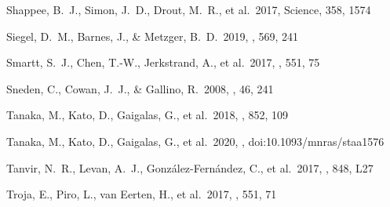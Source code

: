 \documentclass[twocolumn]{aastex63}
\begin{document}
\begin{thebibliography}{}



 Shappee, B.~J., Simon, J.~D., Drout, M.~R., et al.\ 2017, Science, 358, 1574




 Siegel, D.~M., Barnes, J., \& Metzger, B.~D.\ 2019, \nat, 569, 241

 Smartt, S.~J., Chen, T.-W., Jerkstrand, A., et al.\ 2017, \nat, 551, 75

 Sneden, C., Cowan, J.~J., \& Gallino, R.\ 2008, \araa, 46, 241



 Tanaka, M., Kato, D., Gaigalas, G., et al.\ 2018, \aj, 852, 109


 Tanaka, M., Kato, D., Gaigalas, G., et al.\ 2020, \mnras, doi:10.1093/mnras/staa1576


 Tanvir, N.~R., Levan, A.~J., Gonz{\'a}lez-Fern{\'a}ndez, C., et al.\ 2017, \apjl, 848, L27

 Troja, E., Piro, L., van Eerten, H., et al.\ 2017, \nat, 551, 71


\end{thebibliography}
\end{document}
